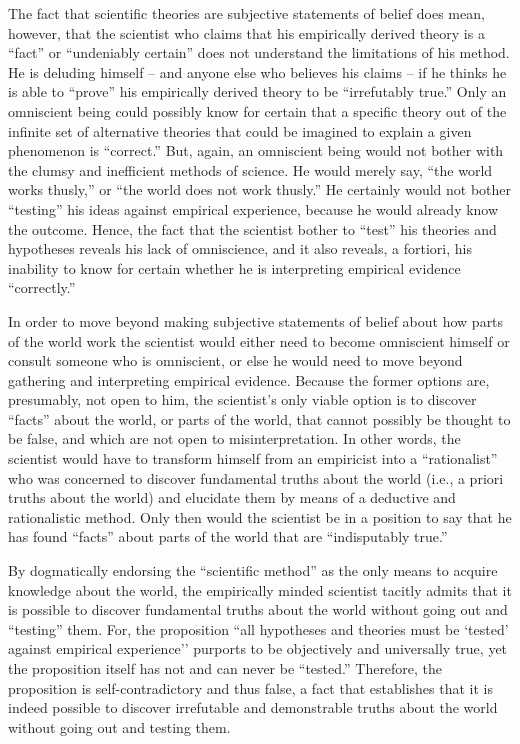 The fact that scientific theories are subjective statements of belief does mean, however, that the scientist who claims that his empirically derived theory is a ``fact'' or ``undeniably certain'' does not understand the limitations of his method. He is deluding himself – and anyone else who believes his claims – if he thinks he is able to ``prove'' his empirically derived theory to be ``irrefutably true.''  Only an omniscient being could possibly know for certain that a specific theory out of the infinite set of alternative theories that could be imagined to explain a given phenomenon is ``correct.''  But, again, an omniscient being would not bother with the clumsy and inefficient methods of science. He would merely say, ``the world works thusly,'' or ``the world does not work thusly.''  He certainly would not bother ``testing'' his ideas against empirical experience, because he would already know the outcome. Hence, the fact that the scientist bother to ``test'' his theories and hypotheses reveals his lack of omniscience, and it also reveals, a fortiori, his inability to know for certain whether he is interpreting empirical evidence ``correctly.''

In order to move beyond making subjective statements of belief about how parts of the world work the scientist would either need to become omniscient himself or consult someone who is omniscient, or else he would need to move beyond gathering and interpreting empirical evidence. Because the former options are, presumably, not open to him, the scientist’s only viable option is to discover “facts” about the world, or parts of the world, that cannot possibly be thought to be false, and which are not open to misinterpretation. In other words, the scientist would have to transform himself from an empiricist into a ``rationalist'' who was concerned to discover fundamental truths about the world (i.e., a priori truths about the world) and elucidate them by means of a deductive and rationalistic method. Only then would the scientist be in a position to say that he has found “facts” about parts of the world that are ``indisputably true.''

By dogmatically endorsing the ``scientific method'' as the only means to acquire knowledge about the world, the empirically minded scientist tacitly admits that it is possible to discover fundamental truths about the world without going out and ``testing'' them. For, the proposition ``all hypotheses and theories must be `tested’ against empirical experience'' purports to be objectively and universally true, yet the proposition itself has not and can never be ``tested.''  Therefore, the proposition is self-contradictory and thus false, a fact that establishes that it is indeed possible to discover irrefutable and demonstrable truths about the world without going out and testing them.

